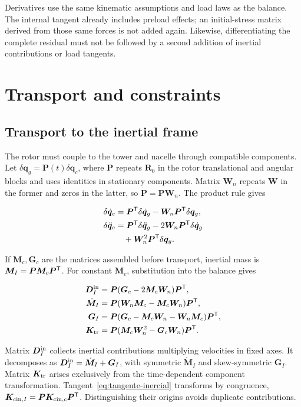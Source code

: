 Derivatives use the same kinematic assumptions and load laws as the balance. The internal tangent already includes preload effects; an initial-stress matrix derived from those same forces is not added again. Likewise, differentiating the complete residual must not be followed by a second addition of inertial contributions or load tangents.

\section{Transport and constraints}
\label{sec:transporte}
\subsection{Transport to the inertial frame}
The rotor must couple to the tower and nacelle through compatible components. Let $\delta\bm q_g=\bm P(t)\delta\bm q_c$, where $\bm P$ repeats $\bm R_0$ in the rotor translational and angular blocks and uses identities in stationary components. Matrix $\bm W_n$ repeats $\bm W$ in the former and zeros in the latter, so $\dot{\bm P}=\bm P\bm W_n$. The product rule gives

\begin{align}
\delta\dot{\bm q}_c
&=\bm P^\mathsf T\delta\dot{\bm q}_g-\bm W_n\bm P^\mathsf T\delta\bm q_g,\nonumber\\
\delta\ddot{\bm q}_c
&=\bm P^\mathsf T\delta\ddot{\bm q}_g-2\bm W_n\bm P^\mathsf T\delta\dot{\bm q}_g\nonumber\\
&\quad+\bm W_n^2\bm P^\mathsf T\delta\bm q_g.
\end{align}

If $\bm M_c,\bm G_c$ are the matrices assembled before transport, inertial mass is $\bm M_I=\bm P\bm M_c\bm P^\mathsf T$. For constant $\bm M_c$, substitution into the balance gives

\begin{align}
\bm D_I^{\rm in}&=\bm P(\bm G_c-2\bm M_c\bm W_n)\bm P^\mathsf T,\nonumber\\
\dot{\bm M}_I&=\bm P(\bm W_n\bm M_c-\bm M_c\bm W_n)\bm P^\mathsf T,\nonumber\\
\bm G_I&=\bm P(\bm G_c-\bm M_c\bm W_n-\bm W_n\bm M_c)\bm P^\mathsf T,\label{eq:transportG}\\
\bm K_{\rm tr}&=\bm P(\bm M_c\bm W_n^2-\bm G_c\bm W_n)\bm P^\mathsf T.
\label{eq:transportK}
\end{align}

Matrix $\bm D_I^{\rm in}$ collects inertial contributions multiplying velocities in fixed axes. It decomposes as $\bm D_I^{\rm in}=\dot{\bm M}_I+\bm G_I$, with symmetric $\dot{\bm M}_I$ and skew-symmetric $\bm G_I$. Matrix $\bm K_{\rm tr}$ arises exclusively from the time-dependent component transformation. Tangent~\eqref{eq:tangente-inercial} transforms by congruence, $\bm K_{{\rm cin},I}=\bm P\bm K_{{\rm cin},c}\bm P^\mathsf T$. Distinguishing their origins avoids duplicate contributions.

